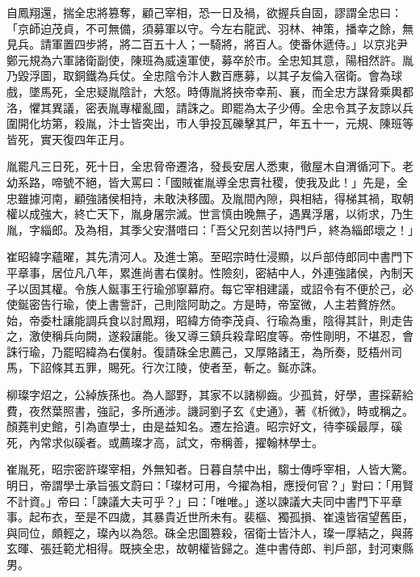 \begin{pinyinscope}
 自鳳翔還，揣全忠將篡奪，顧己宰相，恐一日及禍，欲握兵自固，謬謂全忠曰：「京師迫茂貞，不可無備，須募軍以守。今左右龍武、羽林、神策，播幸之餘，無見兵。請軍置四步將，將二百五十人；一騎將，將百人。使番休遞侍。」以京兆尹鄭元規為六軍諸衛副使，陳班為威遠軍使，募卒於市。全忠知其意，陽相然許。胤乃毀浮圖，取銅鐵為兵仗。全忠陰令汴人數百應募，以其子友倫入宿衛。會為球戲，墜馬死，全忠疑胤陰計，大怒。時傳胤將挾帝幸荊、襄，而全忠方謀脅乘輿都洛，懼其異議，密表胤專權亂國，請誅之。即罷為太子少傅。全忠令其子友諒以兵圍開化坊第，殺胤，汴士皆突出，市人爭投瓦礫擊其尸，年五十一，元規、陳班等皆死，實天復四年正月。



 胤罷凡三日死，死十日，全忠脅帝遷洛，發長安居人悉東，徹屋木自渭循河下。老幼系路，啼號不絕，皆大罵曰：「國賊崔胤導全忠賣社稷，使我及此！」先是，全忠雖據河南，顧強諸侯相持，未敢決移國。及胤間內隙，與相結，得梯其禍，取朝權以成強大，終亡天下，胤身屠宗滅。世言慎由晚無子，遇異浮屠，以術求，乃生胤，字緇郎。及為相，其季父安潛唶曰：「吾父兄刻苦以持門戶，終為緇郎壞之！」



 崔昭緯字蘊曜，其先清河人。及進士第。至昭宗時仕浸顯，以戶部侍郎同中書門下平章事，居位凡八年，累進尚書右僕射。性險刻，密結中人，外連強諸侯，內制天子以固其權。令族人鋋事王行瑜邠寧幕府。每它宰相建議，或詔令有不便於己，必使鋋密告行瑜，使上書訾訐，己則陰阿助之。方是時，帝室微，人主若贅斿然。始，帝委杜讓能調兵食以討鳳翔，昭緯方倚李茂貞、行瑜為重，陰得其計，則走告之，激使稱兵向闕，遂殺讓能。後又導三鎮兵殺韋昭度等。帝性剛明，不堪忍，會誅行瑜，乃罷昭緯為右僕射。復請硃全忠薦己，又厚賂諸王，為所奏，貶梧州司馬，下詔條其五罪，賜死。行次江陵，使者至，斬之。鋋亦誅。



 柳璨字炤之，公綽族孫也。為人鄙野，其家不以諸柳齒。少孤貧，好學，晝採薪給費，夜然葉照書，強記，多所通涉。譏訶劉子玄《史通》，著《析微》，時或稱之。顏蕘判史館，引為直學士，由是益知名。遷左拾遺。昭宗好文，待李磎最厚，磎死，內常求似磎者。或薦璨才高，試文，帝稱善，擢翰林學士。



 崔胤死，昭宗密許璨宰相，外無知者。日暮自禁中出，騶士傳呼宰相，人皆大驚。明日，帝謂學士承旨張文蔚曰：「璨材可用，今擢為相，應授何官？」對曰：「用賢不計資。」帝曰：「諫議大夫可乎？」曰：「唯唯。」遂以諫議大夫同中書門下平章事。起布衣，至是不四歲，其暴貴近世所未有。裴樞、獨孤損、崔遠皆宿望舊臣，與同位，頗輕之，璨內以為怨。硃全忠圖篡殺，宿衛士皆汴人，璨一厚結之，與蔣玄暉、張廷範尤相得。既挾全忠，故朝權皆歸之。進中書侍郎、判戶部，封河東縣男。




\end{pinyinscope}
